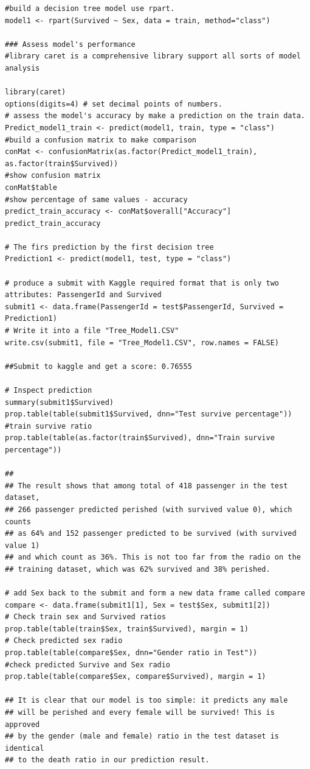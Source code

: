 \documentclass[
]{book}
\begin{document}
\begin{verbatim}
#build a decision tree model use rpart.
model1 <- rpart(Survived ~ Sex, data = train, method="class")

### Assess model's performance
#library caret is a comprehensive library support all sorts of model analysis

library(caret)
options(digits=4) # set decimal points of numbers.
# assess the model's accuracy by make a prediction on the train data.
Predict_model1_train <- predict(model1, train, type = "class")
#build a confusion matrix to make comparison
conMat <- confusionMatrix(as.factor(Predict_model1_train), as.factor(train$Survived))
#show confusion matrix
conMat$table
#show percentage of same values - accuracy
predict_train_accuracy <- conMat$overall["Accuracy"]
predict_train_accuracy

# The firs prediction by the first decision tree
Prediction1 <- predict(model1, test, type = "class")

# produce a submit with Kaggle required format that is only two attributes: PassengerId and Survived
submit1 <- data.frame(PassengerId = test$PassengerId, Survived = Prediction1)
# Write it into a file "Tree_Model1.CSV"
write.csv(submit1, file = "Tree_Model1.CSV", row.names = FALSE)

##Submit to kaggle and get a score: 0.76555

# Inspect prediction
summary(submit1$Survived)
prop.table(table(submit1$Survived, dnn="Test survive percentage"))
#train survive ratio
prop.table(table(as.factor(train$Survived), dnn="Train survive percentage"))

##
## The result shows that among total of 418 passenger in the test dataset,
## 266 passenger predicted perished (with survived value 0), which counts
## as 64% and 152 passenger predicted to be survived (with survived value 1)
## and which count as 36%. This is not too far from the radio on the
## training dataset, which was 62% survived and 38% perished.

# add Sex back to the submit and form a new data frame called compare
compare <- data.frame(submit1[1], Sex = test$Sex, submit1[2])
# Check train sex and Survived ratios
prop.table(table(train$Sex, train$Survived), margin = 1)
# Check predicted sex radio
prop.table(table(compare$Sex, dnn="Gender ratio in Test"))
#check predicted Survive and Sex radio
prop.table(table(compare$Sex, compare$Survived), margin = 1)

## It is clear that our model is too simple: it predicts any male
## will be perished and every female will be survived! This is approved
## by the gender (male and female) ratio in the test dataset is identical
## to the death ratio in our prediction result.


\end{verbatim}
\end{document}
